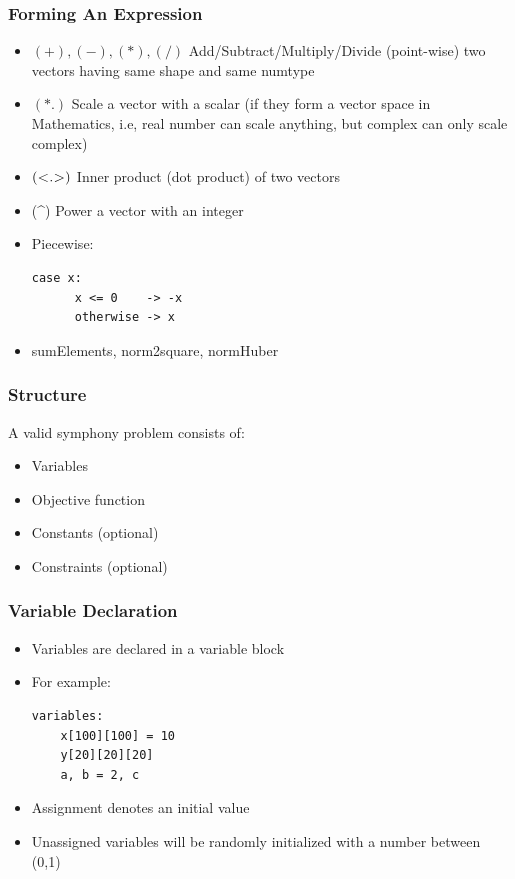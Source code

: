 \documentclass[presentation]{beamer}
\begin{document}
\begin{frame}[fragile]
  \frametitle{Forming An Expression}

  \begin{itemize}
    \item $(+),(-),(*),(/)$ Add/Subtract/Multiply/Divide (point-wise) two vectors having same shape and same numtype
    \item $(*.)$ Scale a vector with a scalar (if they form a vector space in Mathematics, i.e, real number can scale anything, 
    but complex can only scale complex)
    \item $(\textsc{<.>})$ Inner product (dot product) of two vectors 
    \item (\^{}) Power a vector with an integer
    \item Piecewise:
    \begin{lstlisting}[style=Haskell]
    case x:
      x <= 0    -> -x
      otherwise -> x
    \end{lstlisting} 
    \item sumElements, norm2square, normHuber
  \end{itemize}
\end{frame}


\begin{frame}[fragile]
  \frametitle{Structure}
  A valid symphony problem consists of:
  \begin{itemize}
  \item Variables 
  \item Objective function 
  \item Constants (optional)
  \item Constraints (optional)
  \end{itemize}
\end{frame}

\begin{frame}[fragile]
  \frametitle{Variable Declaration}

  \begin{itemize}
  \item Variables are declared in a {\color{red} variable} block
  \item For example:
  \begin{lstlisting}[style=Haskell]
  variables:
    x[100][100] = 10
    y[20][20][20]
    a, b = 2, c
  \end{lstlisting}
  \item Assignment denotes an initial value
  \item Unassigned variables will be randomly initialized with a number between (0,1)
  \end{itemize}
\end{frame}
\end{document}
